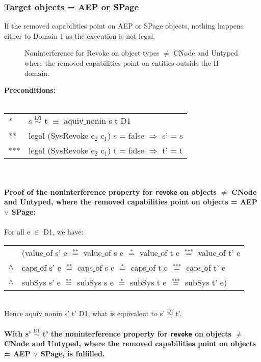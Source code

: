 \subsubsection{Target objects = AEP or SPage}
If the removed capabilities point on AEP or SPage objects, nothing happens either to Domain 1 as the execution is not legal. 
\begin{figure}[H]
\caption{Noninterference for Revoke on object types $\neq$ CNode and Untyped where the removed capabilities point on entities outside the H domain.}
\label{fig:RevokeOutside2}
\end{figure}
\textbf{Preconditions:} \\ \\
\begin{tabular}{ll}
* & s $\overset{\text{D1}}{\sim}$ t $\equiv$ aquiv$\_$nonin s t D1	\\ 
** & legal (SysRevoke e$_2$ c$_1$) s = false $\Rightarrow$ s' = s \\ 
*** & legal (SysRevoke e$_2$ c$_1$) t = false $\Rightarrow$ t' = t
\end{tabular} \\ \\ 
\textbf{Proof of the noninterference property for \texttt{revoke} on objects $\neq$ CNode and Untyped, where the removed capabilities point on objects = AEP $\vee$ SPage:}\\ \\
For all e $\in$ D1, we have: \\ 
\begin{tabular}{ll}
& (value$\_$of s' e $\overset{\text{**}}{=}$ value$\_$of s e $\overset{\text{*}}{=}$ value$\_$of t e $\overset{\text{***}}{=}$ value$\_$of t' e \\
$\wedge$ & caps$\_$of s' e $\overset{\text{**}}{=}$ caps$\_$of s e $\overset{\text{*}}{=}$ caps$\_$of t e $\overset{\text{***}}{=}$ caps$\_$of t' e \\
$\wedge$ & subSys s' e $\overset{\text{**}}{=}$ subSys s e $\overset{\text{*}}{=}$ subSys t e $\overset{\text{***}}{=}$ subSys t' e)
\end{tabular} \\
Hence aquiv$\_$nonin s' t' D1, what is equivalent to s' $\overset{\text{D1}}{\sim}$ t'.\\ \\ 
\textbf{With s' $\overset{\text{D1}}{\sim}$ t' the noninterference property for \texttt{revoke} on objects $\neq$ CNode and Untyped, where the removed capabilities point on objects = AEP $\vee$ SPage, is fulfilled.}  